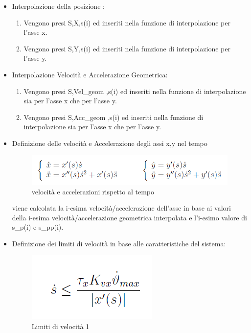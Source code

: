 \documentclass{article}
\begin{document}
\begin{itemize}
    \item Interpolazione della posizione :
    \begin{enumerate}
        \item     Vengono presi S,X,s(i) ed inseriti nella funzione di interpolazione  per l'asse x.
        \item    Vengono presi S,Y,s(i) ed inseriti nella funzione di interpolazione  per l'asse y.
    \end{enumerate}

    \item Interpolazione Velocità e Accelerazione Geometrica:
    \begin{enumerate}
        \item     Vengono presi S,Vel\_geom ,s(i) ed inseriti nella funzione di interpolazione sia per l'asse x che per l'asse y.
        \item    Vengono presi S,Acc\_geom ,s(i) ed inseriti nella funzione di interpolazione sia per l'asse x che per l'asse y.
    \end{enumerate}

    \item Definizione delle velocità e Accelerazione degli assi x,y nel tempo
    \begin{figure}[H]
    \centering
    \includegraphics[width=.8\textwidth]{./strategia/velacc_tempo.png}
    \caption{ velocità e accelerazioni rispetto al tempo}
    \end{figure}
    viene calcolata la i-esima velocità/accelerazione dell'asse in base ai valori della i-esima velocità/accelerazione geometrica interpolata e l'i-esimo valore di s\_p(i) e s\_pp(i).  
    \item Definizione dei limiti di velocità in base alle caratteristiche del sistema:
 
        
        \begin{figure}[H]
        \centering
        \includegraphics[width=.3\textwidth]{./strategia/limiti_v1.png}
        \caption{ Limiti di velocità 1}
        \end{figure}
        

\end{itemize}
\end{document}
